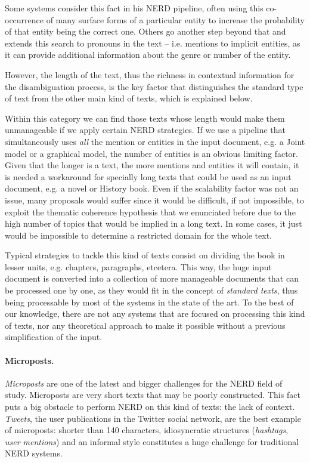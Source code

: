 Some systems consider this fact in his NERD pipeline, often using this co-occurrence of many surface forms of a particular entity to increase the probability of that entity being the correct one. Others go another step beyond that and extends this search to pronouns in the text -- i.e. mentions to implicit entities, as it can provide additional information about the genre or number of the entity.

However, the length of the text, thus the richness in contextual information for the disambiguation process, is the key factor that distinguishes the standard type of text from the other main kind of texts, which is explained below.

Within this category we can find those texts whose length would make them unmanageable if we apply certain NERD strategies. If we use a pipeline that simultaneously uses \emph{all} the mention or entities in the input document, e.g. a Joint model or a graphical model, the number of entities is an obvious limiting factor. Given that the longer is a text, the more mentions and entities it will contain, it is needed a workaround for specially long texts that could be used as an input document, e.g. a novel or History book. Even if the scalability factor was not an issue, many proposals would suffer since it would be difficult, if not impossible, to exploit the thematic coherence hypothesis that we enunciated before due to the high number of topics that would be implied in a long text. In some cases, it just would be impossible to determine a restricted domain for the whole text.

Typical strategies to tackle this kind of texts consist on dividing the book in lesser units, e.g. chapters, paragraphs, etcetera. This way, the huge input document is converted into a collection of more manageable documents that can be processed one by one, as they would fit in the concept of \emph{standard texts}, thus being processable by most of the systems in the state of the art. To the best of our knowledge, there are not any systems that are focused on processing this kind of texts, nor any theoretical approach to make it possible without a previous simplification of the input. 

\paragraph{Microposts.}

\emph{Microposts} are one of the latest and bigger challenges for the NERD field of study. Microposts are very short texts that may be poorly constructed. This fact puts a big obstacle to perform NERD on this kind of texts: the lack of context. \emph{Tweets}, the user publications in the Twitter social network, are the best example of microposts: shorter than 140 characters, idiosyncratic structures (\emph{hashtags}, \emph{user mentions}) and an informal style constitutes a huge challenge for traditional NERD systems.

